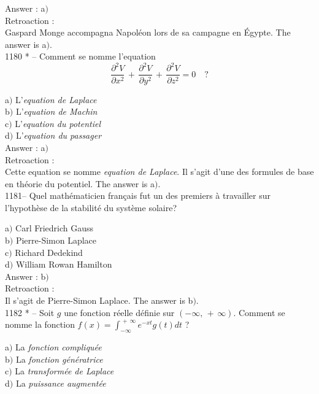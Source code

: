 ﻿\documentclass[letterpaper, 12pt]{article}
\begin{document}
Answer : a$)$\\

Retroaction : \\
Gaspard Monge accompagna Napol\'eon lors de sa campagne en \'Egypte.
The answer is a$)$.\\

1180 * -- Comment se nomme l'equation
$$\displaystyle{\frac{\partial^2V}{\partial
x^2}\,+\,\frac{\partial^2V}{\partial y^2}\,+\,\frac{\partial^2V}{\partial
z^2}=0}\quad?$$

a$)$ L'{\sl equation de Laplace} \\
b$)$ L'{\sl equation de Machin} \\
c$)$ L'{\sl equation du potentiel} \\
d$)$ L'{\sl equation du passager}\\


Answer : a$)$\\

Retroaction : \\
Cette equation se nomme {\sl equation de Laplace}. Il s'agit
d'une des formules de base en th\'eorie du potentiel.
The answer is a$)$.\\

1181-- Quel math\'ematicien fran\c cais fut un des premiers \`a
travailler sur l'hypoth\`ese de la stabilit\'e du syst\`eme solaire?

a$)$ Carl Friedrich Gauss \\
b$)$ Pierre-Simon Laplace \\
c$)$ Richard Dedekind \\
d$)$ William Rowan Hamilton\\

Answer : b$)$\\

Retroaction : \\
Il s'agit de Pierre-Simon Laplace.
The answer is b$)$.\\

1182 * -- Soit $g$ une fonction r\'eelle d\'efinie sur
$(-\infty,\,+\,\infty)$. Comment se nomme la fonction
$f(x)=\int_{-\infty}^{\,+\,\infty}e^{-xt}g(t)dt$ ?

a$)$ La {\sl fonction compliqu\'ee} \\
b$)$ La {\sl fonction g\'en\'eratrice} \\
c$)$ La {\sl transform\'ee de Laplace} \\
d$)$ La {\sl puissance augment\'ee}\\
\end{document}
